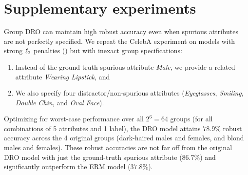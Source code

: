 \section{Supplementary experiments}\label{sec:supp_expt}

Group DRO can maintain high robust accuracy even when spurious attributes are not perfectly specified. We repeat the CelebA experiment on models with strong $\ell_2$ penalties () but with inexact group specifications:
\begin{enumerate}
  \item Instead of the ground-truth spurious attribute \emph{Male}, we provide a related attribute \emph{Wearing Lipstick}, and
  \item We also specify four distractor/non-spurious attributes (\emph{Eyeglasses}, \emph{Smiling}, \emph{Double Chin}, and \emph{Oval Face}).
\end{enumerate}
Optimizing for worst-case performance over all $2^6 = 64$ groups (for all combinations of 5 attributes and 1 label), the DRO model attains $78.9\%$ robust accuracy across the 4 original groups (dark-haired males and females, and blond males and females). These robust accuracies are not far off from the original DRO model with just the ground-truth spurious attribute ($86.7\%$) and significantly outperform the ERM model ($37.8\%$).
